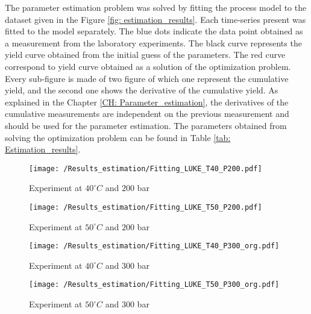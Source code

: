 \documentclass[../Article_Model_Parameters.tex]{subfiles}
\begin{document}
	
	\label{CH: Results}

    The parameter estimation problem was solved by fitting the process model to the dataset given in the Figure \ref{fig: estimation_results}. Each time-series present was fitted to the model separately. The blue dots indicate the data point obtained as a measurement from the laboratory experiments. The black curve represents the yield curve obtained from the initial guess of the parameters. The red curve correspond to yield curve obtained as a solution of the optimization problem. Every sub-figure is made of two figure of which one represent the cumulative yield, and the second one shows the derivative of the cumulative yield. As explained in the Chapter \ref{CH: Parameter_estimation}, the derivatives of the cumulative measurements are independent on the previous measurement and should be used for the parameter estimation.
    The parameters obtained from solving the optimization problem can be found in Table \ref{tab: Estimation_results}.
    
    \begin{figure*}[!h]
    	\centering
    	\begin{subfigure}[b]{\columnwidth}
    		\centering
    		\texttt{[image: /Results\_estimation/Fitting\_LUKE\_T40\_P200.pdf]}
    		\caption{Experiment at $40^\circ C$ and $200$ bar}
    	\end{subfigure}
    	\begin{subfigure}[b]{\columnwidth}
    		\centering
    		\texttt{[image: /Results\_estimation/Fitting\_LUKE\_T50\_P200.pdf]}
    		\caption{Experiment at $50^\circ C$ and $200$ bar}
    	\end{subfigure}
    	\hfill
    	\begin{subfigure}[b]{\columnwidth}
    		\centering
    		\texttt{[image: /Results\_estimation/Fitting\_LUKE\_T40\_P300\_org.pdf]}
    		\caption{Experiment at $40^\circ C$ and $300$ bar}
    	\end{subfigure}
    	\begin{subfigure}[b]{\columnwidth}
    		\centering
    		\texttt{[image: /Results\_estimation/Fitting\_LUKE\_T50\_P300\_org.pdf]}
    		\caption{Experiment at $50^\circ C$ and $300$ bar}
    	\end{subfigure}
    	\caption{Results of parameter estimation}
    	\label{fig: estimation_results}
    \end{figure*}
\end{document}
